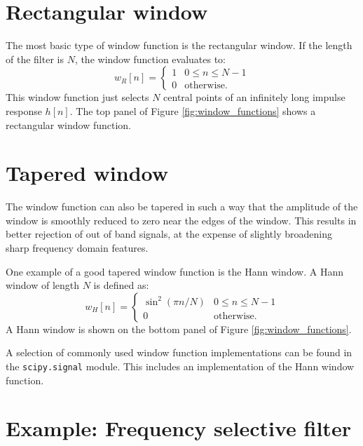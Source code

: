 \section{Rectangular window}

The most basic type of window function is the rectangular window. If
the length of the filter is $N$, the window function evaluates to:
\begin{equation}
w_{R}[n] =\left\{ \begin{array}{cc}
1 & 0 \le n \le N-1\\
0 & \mathrm{otherwise}.
\end{array}
\right.
\end{equation}
This window function just selects $N$ central points of an infinitely
long impulse response $h[n]$.  The top panel of Figure
\ref{fig:window_functions} shows a rectangular window function.


\section{Tapered window}

The window function can also be tapered in such a way that the
amplitude of the window is smoothly reduced to zero near the edges of
the window. This results in better rejection of out of band signals,
at the expense of slightly broadening sharp frequency domain
features.

One example of a good tapered window function is the Hann window. A
Hann window of length $N$ is defined as:
\begin{equation}
w_{H}[n] =\left\{ \begin{array}{cc}
\sin^2(\pi n/N) &  0 \le n \le N-1\\
0 & \mathrm{otherwise}.
\end{array}
\right.
\label{eq:hann_window_def}
\end{equation}
A Hann window is shown on the bottom panel of Figure
\ref{fig:window_functions}.

A selection of commonly used window function implementations can be
found in the \verb|scipy.signal| module. This includes an
implementation of the Hann window function.


\section{Example: Frequency selective filter}

